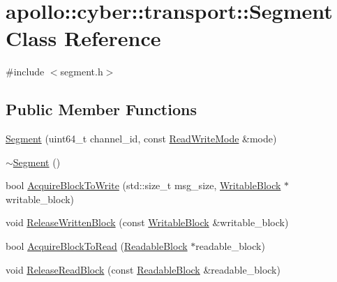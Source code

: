 \hypertarget{classapollo_1_1cyber_1_1transport_1_1Segment}{\section{apollo\-:\-:cyber\-:\-:transport\-:\-:Segment Class Reference}
\label{classapollo_1_1cyber_1_1transport_1_1Segment}
}


{\ttfamily \#include $<$segment.\-h$>$}

\subsection*{Public Member Functions}
\begin{DoxyCompactItemize}
\item 
\hyperlink{classapollo_1_1cyber_1_1transport_1_1Segment_ae8bfb4d78dd55afa88dbdd4da4457933}{Segment} (uint64\-\_\-t channel\-\_\-id, const \hyperlink{namespaceapollo_1_1cyber_1_1transport_a020d15a7a063c0bdae65bd0a96c4a960}{Read\-Write\-Mode} \&mode)
\item 
\hyperlink{classapollo_1_1cyber_1_1transport_1_1Segment_ad70526aa7c3592c069d1e5c9388f5425}{$\sim$\-Segment} ()
\item 
bool \hyperlink{classapollo_1_1cyber_1_1transport_1_1Segment_aa4c6ee5c4e2ee304a20316bcf6ff4de3}{Acquire\-Block\-To\-Write} (std\-::size\-\_\-t msg\-\_\-size, \hyperlink{structapollo_1_1cyber_1_1transport_1_1WritableBlock}{Writable\-Block} $\ast$writable\-\_\-block)
\item 
void \hyperlink{classapollo_1_1cyber_1_1transport_1_1Segment_aec54ea16d4a5ba09ed10e80ff2beb78c}{Release\-Written\-Block} (const \hyperlink{structapollo_1_1cyber_1_1transport_1_1WritableBlock}{Writable\-Block} \&writable\-\_\-block)
\item 
bool \hyperlink{classapollo_1_1cyber_1_1transport_1_1Segment_a02924fcfc5a10a6a0e94a9c352307d2e}{Acquire\-Block\-To\-Read} (\hyperlink{namespaceapollo_1_1cyber_1_1transport_a38f70b996ac896a1bc06d4598f1d0070}{Readable\-Block} $\ast$readable\-\_\-block)
\item 
void \hyperlink{classapollo_1_1cyber_1_1transport_1_1Segment_a63ccce7f12f1b6e9a1b7a9e97b146d06}{Release\-Read\-Block} (const \hyperlink{namespaceapollo_1_1cyber_1_1transport_a38f70b996ac896a1bc06d4598f1d0070}{Readable\-Block} \&readable\-\_\-block)
\end{DoxyCompactItemize}
